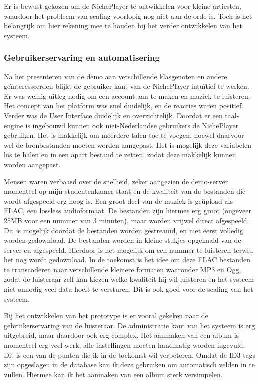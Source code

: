 Er is bewust gekozen om de NichePlayer te ontwikkelen voor kleine artiesten, waardoor het probleem van scaling voorlopig nog niet aan de orde is. Toch is het belangrijk om hier rekening mee te houden bij het verder ontwikkelen van het systeem.

\subsubsection*{Gebruikerservaring en automatisering}
Na het presenteren van de demo aan verschillende klasgenoten en andere geïnteresseerden blijkt de gebruiker kant van de NichePlayer intuïtief te werken. Er was weinig uitleg nodig om een account aan te maken en muziek te luisteren. Het concept van het platform was snel duidelijk, en de reacties waren positief. Verder was de User Interface duidelijk en overzichtelijk. Doordat er een taal-engine is ingebouwd kunnen ook niet-Nederlandse gebruikers de NichePlayer gebruiken. Het is makkelijk om meerdere talen toe te voegen, hoewel daarvoor wel de bronbestanden moeten worden aangepast. Het is mogelijk deze variabelen los te halen en in een apart bestand te zetten, zodat deze makkelijk kunnen worden aangepast.

Mensen waren verbaasd over de snelheid, zeker aangezien de demo-server momenteel op mijn studentenkamer staat en de kwaliteit van de bestanden die wordt afgespeeld erg hoog is. Een groot deel van de muziek is geüpload als FLAC, een lossless audioformaat. De bestanden zijn hiermee erg groot (ongeveer 25MB voor een nummer van 3 minuten), maar worden vrijwel direct afgespeeld. Dit is mogelijk doordat de bestanden worden gestreamd, en niet eerst volledig worden gedownload. De bestanden worden in kleine stukjes opgehaald van de server en afgespeeld. Hierdoor is het mogelijk om een nummer te luisteren terwijl het nog wordt gedownload. In de toekomst is het idee om deze FLAC bestanden te transcoderen naar verschillende kleinere formaten waaronder MP3 en Ogg, zodat de luisteraar zelf kan kiezen welke kwaliteit hij wil luisteren en het systeem niet onnodig veel data hoeft te versturen. Dit is ook goed voor de scaling van het systeem.

Bij het ontwikkelen van het prototype is er vooral gekeken naar de gebruikerservaring van de luisteraar. De administratie kant van het systeem is erg uitgebreid, maar daardoor ook erg complex. Het aanmaken van een album is momenteel erg veel werk, alle instellingen moeten handmatig worden ingevuld. Dit is een van de punten die ik in de toekomst wil verbeteren. Omdat de ID3 tags zijn opgeslagen in de database kan ik deze gebruiken om automatisch velden in te vullen. Hiermee kan ik het aanmaken van een album sterk versimpelen.

